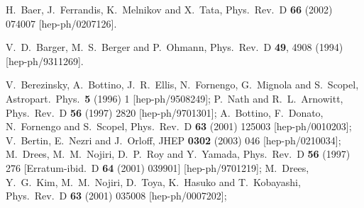 \documentclass[final,3p,11pt,pdflatex]{elsarticle}
\begin{document}
\begin{thebibliography}{100}
  H.~Baer, J.~Ferrandis, K.~Melnikov and X.~Tata,
  Phys.\ Rev.\ D {\bf 66} (2002) 074007
  [hep-ph/0207126].

  V.~D.~Barger, M.~S.~Berger and P.~Ohmann,
  Phys.\ Rev.\ D {\bf 49}, 4908 (1994)
  [hep-ph/9311269].

  V.~Berezinsky, A.~Bottino, J.~R.~Ellis, N.~Fornengo, G.~Mignola and S.~Scopel,
  Astropart.\ Phys.\  {\bf 5} (1996) 1
  [hep-ph/9508249];
  P.~Nath and R.~L.~Arnowitt,
  Phys.\ Rev.\ D {\bf 56} (1997) 2820
  [hep-ph/9701301];
  A.~Bottino, F.~Donato, N.~Fornengo and S.~Scopel,
  Phys.\ Rev.\ D {\bf 63} (2001) 125003
  [hep-ph/0010203];
  V.~Bertin, E.~Nezri and J.~Orloff,
  JHEP {\bf 0302} (2003) 046
  [hep-ph/0210034];
%
  M.~Drees, M.~M.~Nojiri, D.~P.~Roy and Y.~Yamada,
  Phys.\ Rev.\ D {\bf 56} (1997) 276
   [Erratum-ibid.\ D {\bf 64} (2001) 039901]
  [hep-ph/9701219];
  M.~Drees, Y.~G.~Kim, M.~M.~Nojiri, D.~Toya, K.~Hasuko and T.~Kobayashi,
  Phys.\ Rev.\ D {\bf 63} (2001) 035008
  [hep-ph/0007202];
%

\end{thebibliography}
\end{document}
